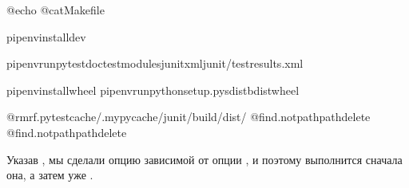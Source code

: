 \documentclass[letterpaper,10pt,russian]{sphinxmanual}
\begin{document}
\begin{sphinxVerbatim}[commandchars=\\\{\}]
@echo
@catMakefile

pipenvinstall\PYGZhy{}\PYGZhy{}dev

pipenvrunpytest\PYGZhy{}\PYGZhy{}doctest\PYGZhy{}modules\PYGZhy{}\PYGZhy{}junitxmljunit/test\PYGZhy{}results.xml

pipenvinstallwheel
pipenvrunpythonsetup.pysdistbdist\PYGZus{}wheel

@rm\PYGZhy{}rf.pytest\PYGZus{}cache/.mypy\PYGZus{}cache/junit/build/dist/
@find.\PYGZhy{}not\PYGZhy{}path\PYGZhy{}path\PYGZhy{}delete
@find.\PYGZhy{}not\PYGZhy{}path\PYGZhy{}path\PYGZhy{}delete
\end{sphinxVerbatim}

\sphinxAtStartPar
Указав , мы сделали опцию  зависимой от опции , и поэтому выполнится сначала она, а затем уже .
\end{document}
